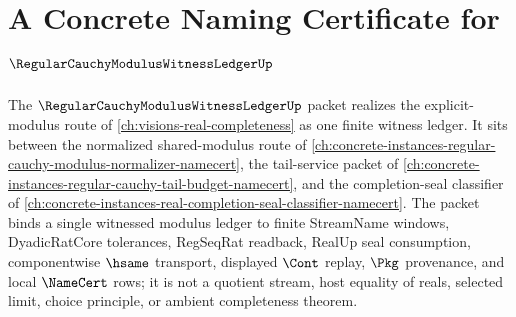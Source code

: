 \chapter{A Concrete Naming Certificate for $\RegularCauchyModulusWitnessLedgerUp$}
\label{ch:concrete-instances-regular-cauchy-modulus-witness-ledger-namecert}

The $\RegularCauchyModulusWitnessLedgerUp$ packet realizes the explicit-modulus route of \autoref{ch:visions-real-completeness} as one finite witness ledger. It sits between the normalized shared-modulus route of \autoref{ch:concrete-instances-regular-cauchy-modulus-normalizer-namecert}, the tail-service packet of \autoref{ch:concrete-instances-regular-cauchy-tail-budget-namecert}, and the completion-seal classifier of \autoref{ch:concrete-instances-real-completion-seal-classifier-namecert}. The packet binds a single witnessed modulus ledger to finite StreamName windows, DyadicRatCore tolerances, RegSeqRat readback, RealUp seal consumption, componentwise $\hsame$ transport, displayed $\Cont$ replay, $\Pkg$ provenance, and local $\NameCert$ rows; it is not a quotient stream, host equality of reals, selected limit, choice principle, or ambient completeness theorem.

